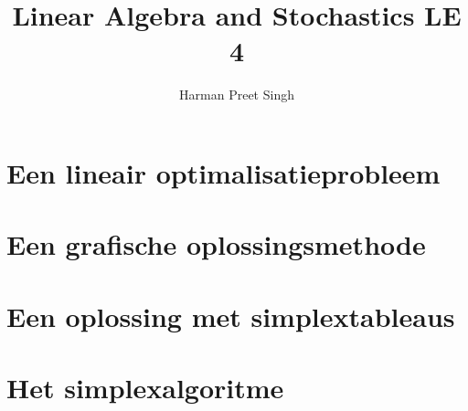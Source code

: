 \documentclass[a4paper, 12pt]{article}
\title{Linear Algebra and Stochastics \textemdash{} LE 4}
\author{Harman Preet Singh}
\begin{document}

\maketitle
\tableofcontents

\section{Een lineair optimalisatieprobleem}
\section{Een grafische oplossingsmethode}
\section{Een oplossing met simplextableaus}
\section{Het simplexalgoritme}
\end{document}
